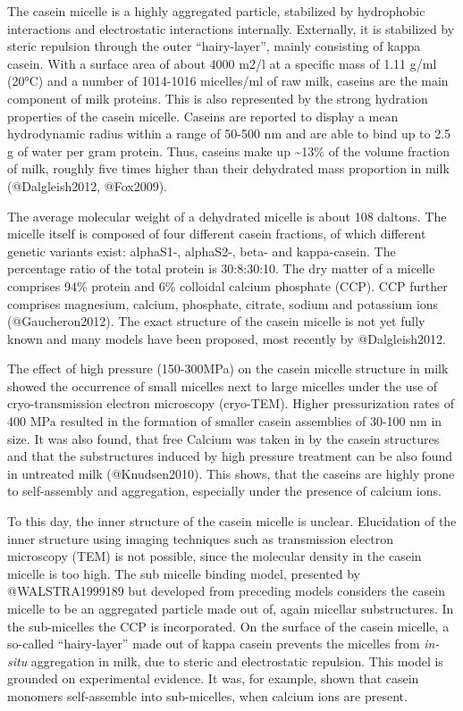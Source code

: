 \documentclass[
]{article}
\begin{document}
The casein micelle is a highly aggregated particle, stabilized by
hydrophobic interactions and electrostatic interactions internally.
Externally, it is stabilized by steric repulsion through the outer
``hairy-layer'', mainly consisting of kappa casein. With a surface area
of about 4000 m2/l at a specific mass of 1.11 g/ml (20°C) and a number
of 1014-1016 micelles/ml of raw milk, caseins are the main component of
milk proteins. This is also represented by the strong hydration
properties of the casein micelle. Caseins are reported to display a mean
hydrodynamic radius within a range of 50-500 nm and are able to bind up
to 2.5 g of water per gram protein. Thus, caseins make up
\textasciitilde13\% of the volume fraction of milk, roughly five times
higher than their dehydrated mass proportion in milk (@Dalgleish2012,
@Fox2009).

The average molecular weight of a dehydrated micelle is about 108
daltons. The micelle itself is composed of four different casein
fractions, of which different genetic variants exist: alphaS1-,
alphaS2-, beta- and kappa-casein. The percentage ratio of the total
protein is 30:8:30:10. The dry matter of a micelle comprises 94\%
protein and 6\% colloidal calcium phosphate (CCP). CCP further comprises
magnesium, calcium, phosphate, citrate, sodium and potassium ions
(@Gaucheron2012). The exact structure of the casein micelle is not yet
fully known and many models have been proposed, most recently by
@Dalgleish2012.

The effect of high pressure (150-300MPa) on the casein micelle structure
in milk showed the occurrence of small micelles next to large micelles
under the use of cryo-transmission electron microscopy (cryo-TEM).
Higher pressurization rates of 400 MPa resulted in the formation of
smaller casein assemblies of 30-100 nm in size. It was also found, that
free Calcium was taken in by the casein structures and that the
substructures induced by high pressure treatment can be also found in
untreated milk (@Knudsen2010). This shows, that the caseins are highly
prone to self-assembly and aggregation, especially under the presence of
calcium ions.

To this day, the inner structure of the casein micelle is unclear.
Elucidation of the inner structure using imaging techniques such as
transmission electron microscopy (TEM) is not possible, since the
molecular density in the casein micelle is too high. The sub micelle
binding model, presented by @WALSTRA1999189 but developed from preceding
models considers the casein micelle to be an aggregated particle made
out of, again micellar substructures. In the sub-micelles the CCP is
incorporated. On the surface of the casein micelle, a so-called
``hairy-layer'' made out of kappa casein prevents the micelles from
\emph{in-situ} aggregation in milk, due to steric and electrostatic
repulsion. This model is grounded on experimental evidence. It was, for
example, shown that casein monomers self-assemble into sub-micelles,
when calcium ions are present.
\end{document}
